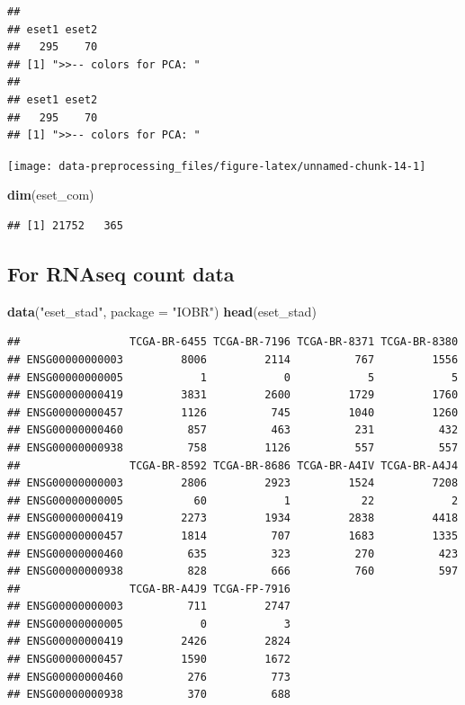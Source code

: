 \documentclass[
  12pt,
]{book}
\newenvironment{Shaded}{\begin{snugshade}}{\end{snugshade}}
\newcommand{\AttributeTok}[1]{\textcolor[rgb]{0.13,0.29,0.53}{#1}}
\newcommand{\FunctionTok}[1]{\textcolor[rgb]{0.13,0.29,0.53}{\textbf{#1}}}
\newcommand{\NormalTok}[1]{#1}
\newcommand{\StringTok}[1]{\textcolor[rgb]{0.31,0.60,0.02}{#1}}
\begin{document}
\begin{verbatim}
## 
## eset1 eset2 
##   295    70 
## [1] ">>-- colors for PCA: "
## 
## eset1 eset2 
##   295    70 
## [1] ">>-- colors for PCA: "
\end{verbatim}

\begin{center}\texttt{[image: data-preprocessing\_files/figure-latex/unnamed-chunk-14-1]} \end{center}

\begin{Shaded}
\begin{Highlighting}[]
\FunctionTok{dim}\NormalTok{(eset\_com)}
\end{Highlighting}
\end{Shaded}

\begin{verbatim}
## [1] 21752   365
\end{verbatim}

\hypertarget{for-rnaseq-count-data}{%
\subsection{For RNAseq count data}\label{for-rnaseq-count-data}}

\begin{Shaded}
\begin{Highlighting}[]
\FunctionTok{data}\NormalTok{(}\StringTok{"eset\_stad"}\NormalTok{, }\AttributeTok{package =} \StringTok{"IOBR"}\NormalTok{)}
\FunctionTok{head}\NormalTok{(eset\_stad)}
\end{Highlighting}
\end{Shaded}

\begin{verbatim}
##                 TCGA-BR-6455 TCGA-BR-7196 TCGA-BR-8371 TCGA-BR-8380
## ENSG00000000003         8006         2114          767         1556
## ENSG00000000005            1            0            5            5
## ENSG00000000419         3831         2600         1729         1760
## ENSG00000000457         1126          745         1040         1260
## ENSG00000000460          857          463          231          432
## ENSG00000000938          758         1126          557          557
##                 TCGA-BR-8592 TCGA-BR-8686 TCGA-BR-A4IV TCGA-BR-A4J4
## ENSG00000000003         2806         2923         1524         7208
## ENSG00000000005           60            1           22            2
## ENSG00000000419         2273         1934         2838         4418
## ENSG00000000457         1814          707         1683         1335
## ENSG00000000460          635          323          270          423
## ENSG00000000938          828          666          760          597
##                 TCGA-BR-A4J9 TCGA-FP-7916
## ENSG00000000003          711         2747
## ENSG00000000005            0            3
## ENSG00000000419         2426         2824
## ENSG00000000457         1590         1672
## ENSG00000000460          276          773
## ENSG00000000938          370          688
\end{verbatim}
\end{document}
